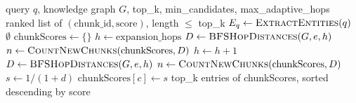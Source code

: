 \documentclass[conference]{IEEEtran}
\begin{document}
\begin{algorithm}[t]
\caption{Multi-Hop Graph Retrieval (as implemented in \texttt{GraphRetriever.retrieve})}
\label{alg:graph}
\begin{algorithmic}[1]
\Require query $q$, knowledge graph $G$, top\_k, min\_candidates, max\_adaptive\_hops
\Ensure ranked list of $(\text{chunk\_id}, \text{score})$, length $\leq$ top\_k
\State $E_q \gets \Call{ExtractEntities}{q}$ 
    \State \Return $\emptyset$
\EndIf
\State $\text{chunkScores} \gets \{\}$
    \State {} 
    \State $h \gets \text{expansion\_hops}$
    \State $D \gets \Call{BFSHopDistances}{G, e, h}$ 
    \State $n \gets \Call{CountNewChunks}{\text{chunkScores}, D}$
        \State $h \gets h + 1$
        \State $D \gets \Call{BFSHopDistances}{G, e, h}$
        \State $n \gets \Call{CountNewChunks}{\text{chunkScores}, D}$
    \EndWhile
        \State $s \gets 1 / (1 + d)$ 
                \State $\text{chunkScores}[c] \gets s$
            \EndIf
        \EndFor
    \EndFor
\EndFor
\State \Return top\_k entries of chunkScores, sorted descending by score
\end{algorithmic}
\end{algorithm}
\end{document}
